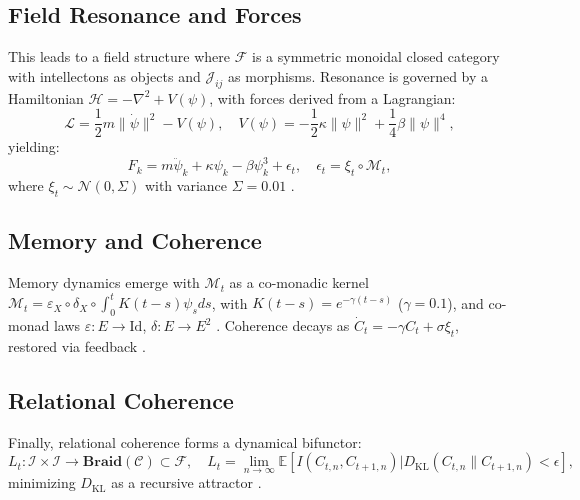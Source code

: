 \documentclass[11pt]{article}
\newcommand{\field}[1]{\mathcal{#1}}
\newcommand{\intellecton}{\mathcal{I}}
\newcommand{\expect}{\mathbb{E}}
\newcommand{\dkl}{D_{\text{KL}}}
\newcommand{\cat}[1]{\mathbf{#1}}
\begin{document}
\subsection{Field Resonance and Forces}
This leads to a field structure where $\field{F}$ is a symmetric monoidal closed category with intellectons as objects and $\mathcal{J}_{ij}$ as morphisms. Resonance is governed by a Hamiltonian $\mathcal{H} = -\nabla^2 + V(\psi)$, with forces derived from a Lagrangian:
\begin{equation}
\mathcal{L} = \frac{1}{2} m \|\dot{\psi}\|^2 - V(\psi), \quad V(\psi) = -\frac{1}{2} \kappa \|\psi\|^2 + \frac{1}{4} \beta \|\psi\|^4,
\label{eq:lagrangian}
\end{equation}
yielding:
\begin{equation}
F_k = m \ddot{\psi}_k + \kappa \psi_k - \beta \psi_k^3 + \epsilon_t, \quad \epsilon_t = \xi_t \circ \mathcal{M}_t,
\label{eq:force}
\end{equation}
where $\xi_t \sim \mathcal{N}(0, \Sigma)$ with variance $\Sigma = 0.01$ \citep{susskind2023}.

\subsection{Memory and Coherence}
Memory dynamics emerge with $\mathcal{M}_t$ as a co-monadic kernel $\mathcal{M}_t = \varepsilon_X \circ \delta_X \circ \int_0^t K(t-s) \psi_s ds$, with $K(t-s) = e^{-\gamma (t-s)}$ ($\gamma = 0.1$), and co-monad laws $\varepsilon: E \to \text{Id}$, $\delta: E \to E^2$ \citep{sheldrake2023}. Coherence decays as $\dot{C}_t = -\gamma C_t + \sigma \xi_t$, restored via feedback \citep{friston2024}.

\subsection{Relational Coherence}
Finally, relational coherence forms a dynamical bifunctor:
\begin{equation}
L_t: \intellecton \times \intellecton \to \cat{Braid}(\field{C}) \subset \field{F}, \quad L_t = \lim_{n \to \infty} \expect[I(C_{t,n}, C_{t+1,n}) | \dkl(C_{t,n} \| C_{t+1,n}) < \epsilon],
\label{eq:relational_coherence}
\end{equation}
minimizing $\dkl$ as a recursive attractor \citep{buber1958}.
\end{document}
